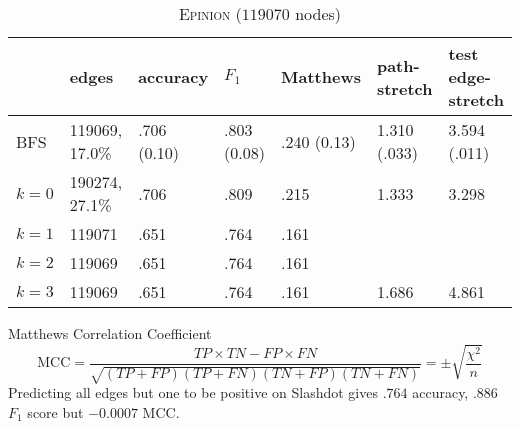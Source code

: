 \documentclass[a4paper,final,notitlepage,11pt,svgnames]{scrartcl}
\begin{document}
\begin{table}[htpb]
	\centering
	\caption{\textsc{Epinion} ($119070$ nodes) \label{tab:epinion}}
	\begin{tabular}{lllllll}
		\toprule
			 & edges          & accuracy    & $F_1$       & Matthews    & path-stretch & test edge-stretch \\
		\midrule
		BFS      & 119069, 17.0\% & .706 (0.10) & .803 (0.08) & .240 (0.13) & 1.310 (.033) & 3.594 (.011)\\
		$k=0$    & 190274, 27.1\% & .706        & .809        & .215        & 1.333        & 3.298\\
		$k=1$    & 119071         & .651        & .764        & .161        &              & \\
		$k=2$    & 119069         & .651        & .764        & .161        &              & \\
		$k=3$    & 119069         & .651        & .764        & .161        & 1.686        & 4.861\\
		\bottomrule
	\end{tabular}
\end{table}

Matthews Correlation Coefficient \[
	\text{MCC} = \frac{ TP \times TN - FP \times FN } {\sqrt{ (TP + FP) ( TP + FN ) (
			TN + FP ) ( TN + FN ) } } = \pm \sqrt{\frac{\chi^2}{n}}
\]
Predicting all edges but one to be positive on Slashdot gives $.764$ accuracy,
$.886$ $F_1$ score but $-0.0007$ MCC.
\end{document}
